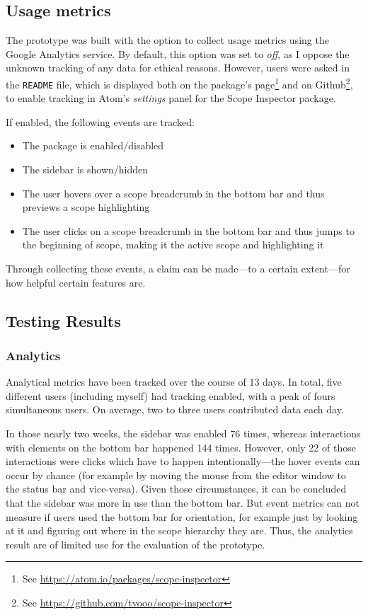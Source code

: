 \subsection{Usage metrics}\label{usage-metrics}

The prototype was built with the option to collect usage metrics using
the Google Analytics service. By default, this option was set to
\emph{off}, as I oppose the unknown tracking of any data for ethical
reasons. However, users were asked in the \texttt{README} file, which is
displayed both on the package’s
page\footnote{See \url{https://atom.io/packages/scope-inspector}} and on
Github\footnote{See \url{https://github.com/tvooo/scope-inspector}}, to
enable tracking in Atom’s \emph{settings} panel for the Scope Inspector
package.

If enabled, the following events are tracked:

\begin{itemize}
\itemsep1pt\parskip0pt
\item
  The package is enabled/disabled
\item
  The sidebar is shown/hidden
\item
  The user hovers over a scope breadcrumb in the bottom bar and thus
  previews a scope highlighting
\item
  The user clicks on a scope breadcrumb in the bottom bar and thus jumps
  to the beginning of scope, making it the active scope and highlighting
  it
\end{itemize}

Through collecting these events, a claim can be made—to a certain
extent—for how helpful certain features are.

\subsection{Testing Results}\label{testing-results}

\subsubsection{Analytics}\label{analytics}

Analytical metrics have been tracked over the course of 13 days. In
total, five different users (including myself) had tracking enabled,
with a peak of fours simultaneous users. On average, two to three users
contributed data each day.

In those nearly two weeks, the sidebar was enabled 76 times, whereas
interactions with elements on the bottom bar happened 144 times.
However, only 22 of those interactions were clicks which have to happen
intentionally—the hover events can occur by chance (for example by
moving the mouse from the editor window to the status bar and
vice-versa). Given those circumstances, it can be concluded that the
sidebar was more in use than the bottom bar. But event metrics can not
measure if users used the bottom bar for orientation, for example just
by looking at it and figuring out where in the scope hierarchy they are.
Thus, the analytics result are of limited use for the evaluation of the
prototype.

